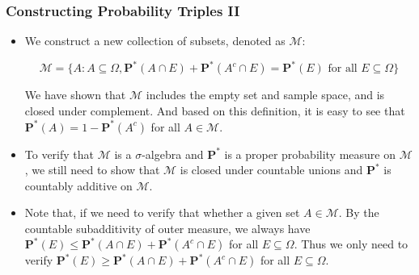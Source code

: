 \documentclass[handout]{beamer}
\newcommand{\BP}{\mathbf{P}}
\begin{document}
\frame
{
  \frametitle{Constructing Probability Triples II }

   \begin{itemize}

      
        \item <1->[4)]   We construct a new collection of subsets, denoted as $\mathcal{M}$:
 
                         $$\mathcal{M}=\{A: A\subseteq \Omega, \BP^*(A\cap E)+\BP^*(A^c\cap E)=\BP^*(E) \text{ for all }E\subseteq \Omega \}$$

 We have shown that $\mathcal{M}$ includes the empty set and sample space, and is closed under complement. And based on this definition, it is easy to see that $\BP^*(A)=1-\BP^*(A^c)$ for all $A\in\mathcal{M}$. 
 
        \item <2->[5)]  To verify that $\mathcal{M}$ is a $\sigma$-algebra and $\BP^*$ is a proper probability measure on $\mathcal{M}$, we still need to show that $\mathcal{M}$ is closed under countable unions and $\BP^*$ is countably additive on $\mathcal{M}$. 
        
        
        
 
            
           \item<3->[6)]  Note that, if we need to verify that whether a given set $A\in \mathcal{M}$. By the countable subadditivity of outer measure, we always have $\BP^*(E) \leq \BP^*(A\cap E)+\BP^*(A^c\cap E)$ for all $E\subseteq \Omega$. Thus we only need to verify  $\BP^*(E) \geq \BP^*(A\cap E)+\BP^*(A^c\cap E)$ for all $E\subseteq \Omega$. 
           
       
                 \end{itemize}
}
\end{document}
